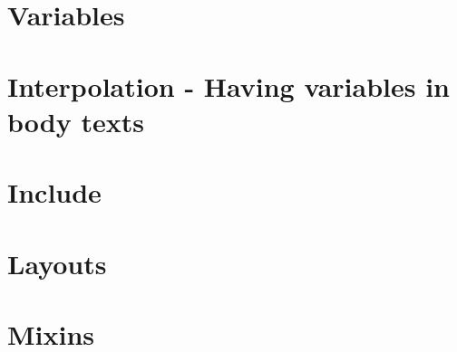 \section{Variables}

\section{Interpolation - Having variables in body texts}

\section{Include}

\section{Layouts}

\section{Mixins}